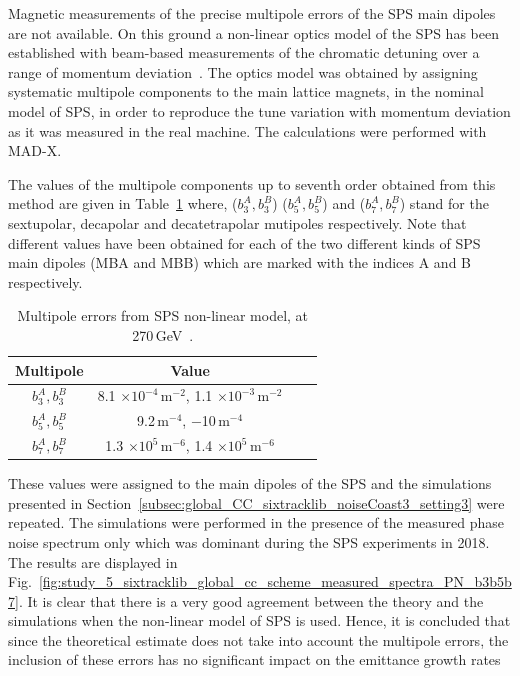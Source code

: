 Magnetic measurements of the precise multipole errors of the SPS main dipoles are not available. On this ground a non-linear optics model of the SPS has been established with beam-based measurements of the chromatic detuning over a range of momentum deviation~\cite{Carlà:2664976, Alekou:2640326}.  The optics model was obtained by assigning systematic multipole components to the main lattice magnets, in the nominal model of SPS, in order to reproduce the tune variation with momentum deviation as it was measured in the real machine. The calculations were performed with MAD-X.

The values of the multipole components up to seventh order obtained from this method are given in Table~\ref{tab:sps_mult_270GeV} where, ($b_3^A, b_3^B$) ($b_5^A, b_5^B$) and ($b_7^A, b_7^B$) stand for the sextupolar, decapolar and decatetrapolar mutipoles respectively. Note that different values have been obtained for each of the two different kinds of SPS main dipoles (MBA and MBB) which are marked with the indices A and B respectively.

\begin{table}[ht] %
    \caption{Multipole errors from SPS non-linear model, at 270\,GeV~\cite{Alekou:2640326}.} %
    \centering %
    \begin{tabular}{c c c c} %
    \hline\hline %
    Multipole & Value  \\ [0.5ex] %
    \hline  %
    $b_3^A, b_3^B$ & 8.1 $\times 10^{-4}$\,$\mathrm{m^{-2}}$, 1.1 $\times 10^{-3}$\,$\mathrm{m^{-2}}$\\ 
    $b_5^A, b_5^B$ & 9.2\,$\mathrm{m^{-4}}$, $-$10\,$\mathrm{m^{-4}}$ \\
    $b_7^A, b_7^B$ & 1.3 $\times 10^{5}$\,$\mathrm{m^{-6}}$, 1.4 $\times 10^{5}$\,$\mathrm{m^{-6}}$\\ [1ex] %
    \hline %
    \end{tabular}
    \label{tab:sps_mult_270GeV} %
\end{table}

These values were assigned to the main dipoles of the SPS and the simulations presented in Section~\ref{subsec:global_CC_sixtracklib_noiseCoast3_setting3} were repeated. The simulations were performed in the presence of the measured phase noise spectrum only which was dominant during the SPS experiments in 2018. The results are displayed in Fig.~\ref{fig:study_5_sixtracklib_global_cc_scheme_measured_spectra_PN_b3b5b7}. It is clear that there is a very good agreement between the theory and the simulations when the non-linear model of SPS is used. Hence, it is concluded that since the theoretical estimate does not take into account the multipole errors, the inclusion of these errors has no significant impact on the emittance growth rates

